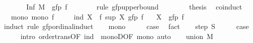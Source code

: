 \begin{isabellebody}
\ \ \ \ \isamarkupfalse%
\ \isamarkupfalse%
\ {\isachardoublequoteopen}Inf\ {\isacharquery}{\kern0pt}M\ {\isasymle}\ gfp\ f{\isachardoublequoteclose}\isanewline
\ \ \ \ \ \ \isamarkupfalse%
\ {\isacharparenleft}{\kern0pt}rule\ gfp{\isacharunderscore}{\kern0pt}upperbound{\isacharparenright}{\kern0pt}\isanewline
\ \ \isamarkupfalse%
\isanewline
\ \ \isamarkupfalse%
\ \isamarkupfalse%
\ {\isacharquery}{\kern0pt}thesis\ \isacommand{{\isachardot}{\kern0pt}}\isamarkupfalse%
\isanewline
{}\isamarkupfalse%
%
\endisatagproof
{\isafoldproof}%
%
\isadelimproof
\isanewline
%
\endisadelimproof
\isanewline
{}\isamarkupfalse%
\ coinduct{\isacharcolon}{\kern0pt}\isanewline
\ \ \ mono{\isacharcolon}{\kern0pt}\ {\isachardoublequoteopen}mono\ f{\isachardoublequoteclose}\isanewline
\ \ \ \ \ ind{\isacharcolon}{\kern0pt}\ {\isachardoublequoteopen}X\ {\isasymle}\ f\ {\isacharparenleft}{\kern0pt}sup\ X\ {\isacharparenleft}{\kern0pt}gfp\ f{\isacharparenright}{\kern0pt}{\isacharparenright}{\kern0pt}{\isachardoublequoteclose}\isanewline
\ \ \ {\isachardoublequoteopen}X\ {\isasymle}\ gfp\ f{\isachardoublequoteclose}\isanewline
%
\isadelimproof
%
\endisadelimproof
%
\isatagproof
{}\isamarkupfalse%
\ {\isacharparenleft}{\kern0pt}induct\ rule{\isacharcolon}{\kern0pt}\ gfp{\isacharunderscore}{\kern0pt}ordinal{\isacharunderscore}{\kern0pt}induct{\isacharparenright}{\kern0pt}\isanewline
\ \ \isamarkupfalse%
\ mono\isanewline
\ \ \isamarkupfalse%
\ \isamarkupfalse%
\ {\isacharquery}{\kern0pt}case\ \isamarkupfalse%
\ fact\isanewline
{}\isamarkupfalse%
\isanewline
\ \ \isamarkupfalse%
\ {\isacharparenleft}{\kern0pt}step\ S{\isacharparenright}{\kern0pt}\isanewline
\ \ \isamarkupfalse%
\ \isamarkupfalse%
\ {\isacharquery}{\kern0pt}case\isanewline
\ \ \ \ \isamarkupfalse%
\ {\isacharparenleft}{\kern0pt}intro\ order{\isacharunderscore}{\kern0pt}trans{\isacharbrackleft}{\kern0pt}OF\ ind\ {\isacharunderscore}{\kern0pt}{\isacharbrackright}{\kern0pt}\ monoD{\isacharbrackleft}{\kern0pt}OF\ mono{\isacharbrackright}{\kern0pt}{\isacharparenright}{\kern0pt}\ auto\isanewline
{}\isamarkupfalse%
\isanewline
\ \ \isamarkupfalse%
\ {\isacharparenleft}{\kern0pt}union\ M{\isacharparenright}{\kern0pt}\isanewline
\ \ \isamarkupfalse%

\end{isabellebody}
